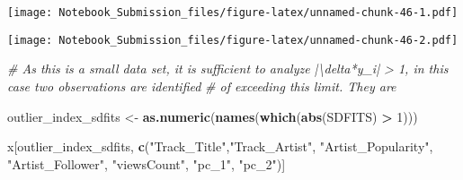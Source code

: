 \documentclass[
]{article}
\newenvironment{Shaded}{\begin{snugshade}}{\end{snugshade}}
\newcommand{\CommentTok}[1]{\textcolor[rgb]{0.56,0.35,0.01}{\textit{#1}}}
\newcommand{\DataTypeTok}[1]{\textcolor[rgb]{0.13,0.29,0.53}{#1}}
\newcommand{\DecValTok}[1]{\textcolor[rgb]{0.00,0.00,0.81}{#1}}
\newcommand{\KeywordTok}[1]{\textcolor[rgb]{0.13,0.29,0.53}{\textbf{#1}}}
\newcommand{\NormalTok}[1]{#1}
\newcommand{\OperatorTok}[1]{\textcolor[rgb]{0.81,0.36,0.00}{\textbf{#1}}}
\newcommand{\StringTok}[1]{\textcolor[rgb]{0.31,0.60,0.02}{#1}}
\begin{document}
\texttt{[image: Notebook\_Submission\_files/figure-latex/unnamed-chunk-46-1.pdf]}

\begin{Shaded}
\end{Shaded}

\texttt{[image: Notebook\_Submission\_files/figure-latex/unnamed-chunk-46-2.pdf]}

\begin{Shaded}
\begin{Highlighting}[]
\CommentTok{# As this is a small data set, it is sufficient to analyze |\textbackslash{}delta*y_i| > 1, in this case two observations are identified}
\CommentTok{# of exceeding this limit. They are}

\NormalTok{outlier_index_sdfits <-}\StringTok{ }\KeywordTok{as.numeric}\NormalTok{(}\KeywordTok{names}\NormalTok{(}\KeywordTok{which}\NormalTok{(}\KeywordTok{abs}\NormalTok{(SDFITS) }\OperatorTok{>}\StringTok{ }\DecValTok{1}\NormalTok{))) }

\NormalTok{x[outlier_index_sdfits, }\KeywordTok{c}\NormalTok{(}\StringTok{"Track_Title"}\NormalTok{,}\StringTok{"Track_Artist"}\NormalTok{, }\StringTok{"Artist_Popularity"}\NormalTok{, }\StringTok{"Artist_Follower"}\NormalTok{, }\StringTok{"viewsCount"}\NormalTok{, }\StringTok{"pc_1"}\NormalTok{,}
                          \StringTok{"pc_2"}\NormalTok{)]}
\end{Highlighting}
\end{Shaded}
\end{document}

